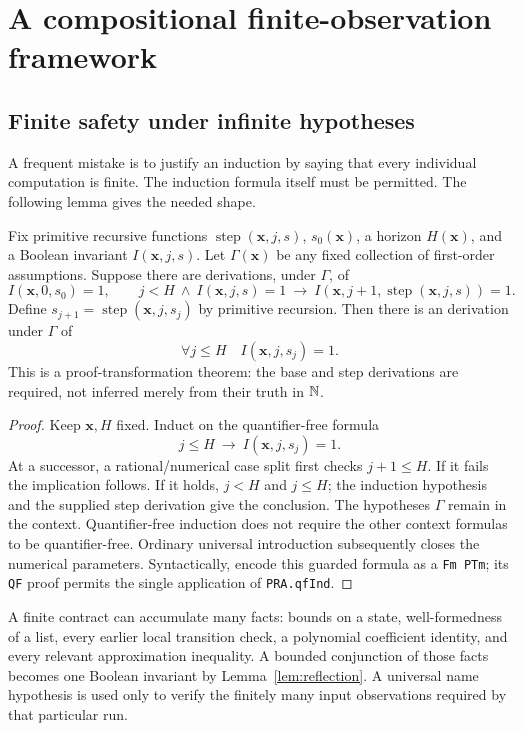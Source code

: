 \section{A compositional finite-observation framework}
\label{sec:compiler}

\subsection{Finite safety under infinite hypotheses}

A frequent mistake is to justify an induction by saying that every
individual computation is finite. The induction formula itself must be
permitted. The following lemma gives the needed shape.

\begin{theorem}
\label{thm:safety}
Fix primitive recursive functions $\operatorname{step}(\mathbf x,j,s)$,
$s_0(\mathbf x)$, a horizon $H(\mathbf x)$, and a Boolean invariant
$I(\mathbf x,j,s)$. Let $\Gamma(\mathbf x)$ be any fixed collection of
first-order assumptions. Suppose there are \iPRA{} derivations, under
$\Gamma$, of
\[
 I(\mathbf x,0,s_0)=1,
 \qquad
 j<H\ \wedge\ I(\mathbf x,j,s)=1
 \ \longrightarrow\ I(\mathbf x,j+1,\operatorname{step}(\mathbf x,j,s))=1.
\]
Define $s_{j+1}=\operatorname{step}(\mathbf x,j,s_j)$ by primitive
recursion. Then there is an \iPRA{} derivation under $\Gamma$ of
\[
 \forall j\le H\quad I(\mathbf x,j,s_j)=1.
\]
This is a proof-transformation theorem: the base and step derivations
are required, not inferred merely from their truth in $\mathbb N$.
\end{theorem}
\begin{proof}
Keep $\mathbf x,H$ fixed. Induct on the quantifier-free formula
\[
 j\le H\ \longrightarrow\ I(\mathbf x,j,s_j)=1.
\]
At a successor, a rational/numerical case split first checks $j+1\le H$.
If it fails the implication follows. If it holds, $j<H$ and $j\le H$;
the induction hypothesis and the supplied step derivation give the
conclusion. The hypotheses $\Gamma$ remain in the context. Quantifier-free
induction does not require the other context formulas to be quantifier-free.
Ordinary universal introduction subsequently closes the numerical
parameters. Syntactically, encode this guarded formula as a
\texttt{Fm PTm}; its \texttt{QF} proof permits the single application
of \texttt{PRA.qfInd}.
\end{proof}

A finite contract can accumulate many facts: bounds on a state,
well-formedness of a list, every earlier local transition check,
a polynomial coefficient identity, and every relevant approximation
inequality. A bounded conjunction of those facts becomes one Boolean
invariant by Lemma~\ref{lem:reflection}. A universal name hypothesis is
used only to verify the finitely many input observations required by that
particular run.

